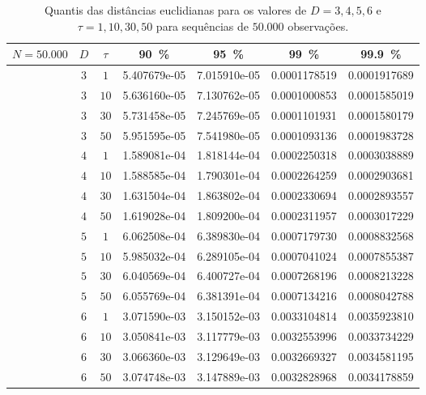 \begin{table}[hbt]
	\centering
	\caption{Quantis das distâncias euclidianas para os valores de $D= 3, 4, 5, 6$ e $\tau=1, 10, 30, 50$ para sequências de $50.000$ observações.}\label{tab:dEuclid_50k}
	\begin{tabular}{ccccccc}
		\toprule
		$N = 50.000$	&  $D$  &$\tau$  &\SI{90}{\percent}&\SI{95}{\percent}&\SI{99}{\percent}&\SI{99.9}{\percent}\\ 
		\midrule
		&  $3$  &  $ 1$  &  5.407679e-05  &  7.015910e-05  &  0.0001178519  &  0.0001917689 \\ 
		&  $3$  &  $10$  &  5.636160e-05  &  7.130762e-05  &  0.0001000853  &  0.0001585019 \\
		&  $3$  &  $30$  &  5.731458e-05  &  7.245769e-05  &  0.0001101931  &  0.0001580179 \\
		&  $3$  &  $50$  &  5.951595e-05  &  7.541980e-05  &  0.0001093136  &  0.0001983728 \\ 
		\midrule
		&  $4$  &  $ 1$  &  1.589081e-04  &  1.818144e-04  &  0.0002250318  &  0.0003038889 \\ 
		&  $4$  &  $10$  &  1.588585e-04  &  1.790301e-04  &  0.0002264259  &  0.0002903681 \\
		&  $4$  &  $30$  &  1.631504e-04  &  1.863802e-04  &  0.0002330694  &  0.0002893557 \\
		&  $4$  &  $50$  &  1.619028e-04  &  1.809200e-04  &  0.0002311957  &  0.0003017229 \\ 
		\midrule
		&  $5$  &  $ 1$  &  6.062508e-04  &  6.389830e-04  &  0.0007179730  &  0.0008832568 \\ 
		&  $5$  &  $10$  &  5.985032e-04  &  6.289105e-04  &  0.0007041024  &  0.0007855387 \\
		&  $5$  &  $30$  &  6.040569e-04  &  6.400727e-04  &  0.0007268196  &  0.0008213228 \\
		&  $5$  &  $50$  &  6.055769e-04  &  6.381391e-04  &  0.0007134216  &  0.0008042788 \\ 
		\midrule
		&  $6$  &  $ 1$  &  3.071590e-03  &  3.150152e-03  &  0.0033104814  &  0.0035923810 \\ 
		&  $6$  &  $10$  &  3.050841e-03  &  3.117779e-03  &  0.0032553996  &  0.0033734229 \\
		&  $6$  &  $30$  &  3.066360e-03  &  3.129649e-03  &  0.0032669327  &  0.0034581195 \\
		&  $6$  &  $50$  &  3.074748e-03  &  3.147889e-03  &  0.0032828968  &  0.0034178859 \\
		\bottomrule
	\end{tabular}
\end{table}

